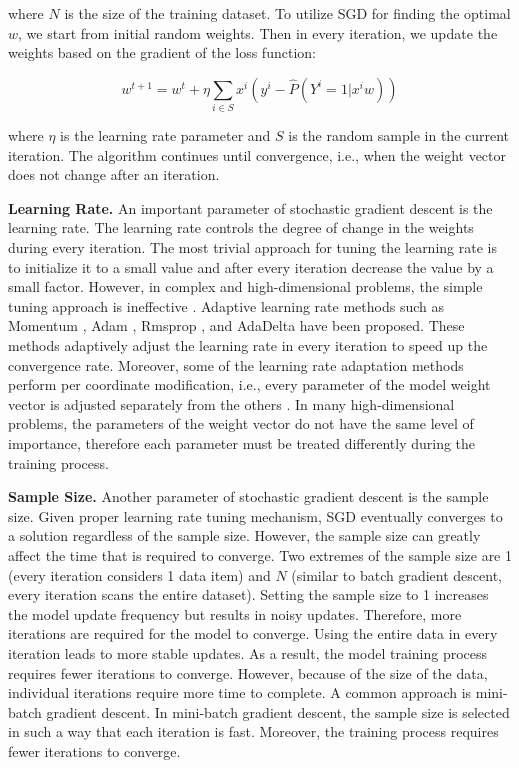 where $N$ is the size of the training dataset.
To utilize SGD for finding the optimal $w$, we start from initial random weights.
Then in every iteration, we update the weights based on the gradient of the loss function:

\begin{center}
$${w}^{t+1} = {w}^t + \eta \sum_{i \in S} x^i (y^i - \hat{P}(Y^i = 1 | x^i w))$$
\end{center}

where $\eta$ is the learning rate parameter and $S$ is the random sample in the current iteration.
The algorithm continues until convergence, i.e., when the weight vector does not change after an iteration.

\textbf{Learning Rate.}
An important parameter of stochastic gradient descent is the learning rate.
The learning rate controls the degree of change in the weights during every iteration.
The most trivial approach for tuning the learning rate is to initialize it to a small value and after every iteration decrease the value by a small factor.
However, in complex and high-dimensional problems, the simple tuning approach is ineffective \cite{schaul2013no}. 
Adaptive learning rate methods such as Momentum \cite{qian1999momentum}, Adam \cite{kingma2014adam}, Rmsprop \cite{tieleman2012lecture}, and AdaDelta \cite{zeiler2012adadelta} have been proposed.
These methods adaptively adjust the learning rate in every iteration to speed up the convergence rate.
Moreover, some of the learning rate adaptation methods perform per coordinate modification, i.e., every parameter of the model weight vector is adjusted separately from the others \cite{kingma2014adam, tieleman2012lecture, zeiler2012adadelta}. 
In many high-dimensional problems, the parameters of the weight vector do not have the same level of importance, therefore each parameter must be treated differently during the training process.

\textbf{Sample Size.}
Another parameter of stochastic gradient descent is the sample size.
Given proper learning rate tuning mechanism, SGD eventually converges to a solution regardless of the sample size.
However, the sample size can greatly affect the time that is required to converge.
Two extremes of the sample size are 1 (every iteration considers 1 data item) and $N$ (similar to batch gradient descent, every iteration scans the entire dataset).
Setting the sample size to 1 increases the model update frequency but results in noisy updates.
Therefore, more iterations are required for the model to converge.
Using the entire data in every iteration leads to more stable updates.
As a result, the model training process requires fewer iterations to converge.
However, because of the size of the data, individual iterations require more time to complete.
A common approach is mini-batch gradient descent.
In mini-batch gradient descent, the sample size is selected in such a way that each iteration is fast.
Moreover, the training process requires fewer iterations to converge.



